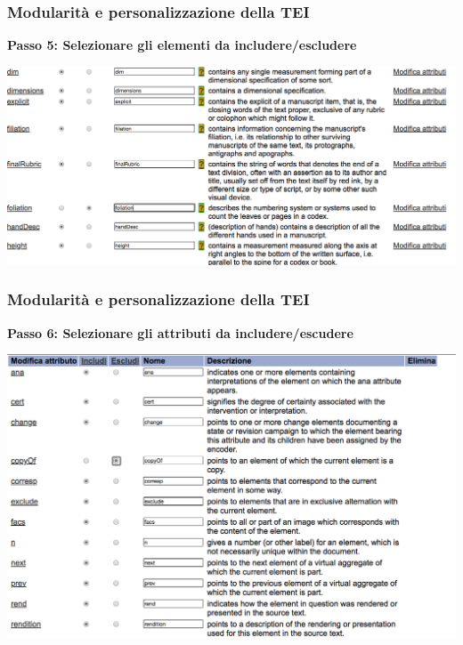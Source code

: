 \begin{frame}
    \frametitle{Modularità e personalizzazione della TEI}
    \addtocounter{nframe}{1}
    
    
    \textbf{Passo 5: Selezionare gli elementi da includere/escludere}

     \begin{center}
        \includegraphics[width=.95\textwidth]{imgs/Roma6.png}
     \end{center}
   
    
\end{frame}

\begin{frame}
    \frametitle{Modularità e personalizzazione della TEI}
    \addtocounter{nframe}{1}
    
    \textbf{Passo 6: Selezionare gli attributi da includere/escudere}

     \begin{center}
        \includegraphics[width=.9\textwidth]{imgs/Roma7.png}
     \end{center}
   
    
\end{frame}

